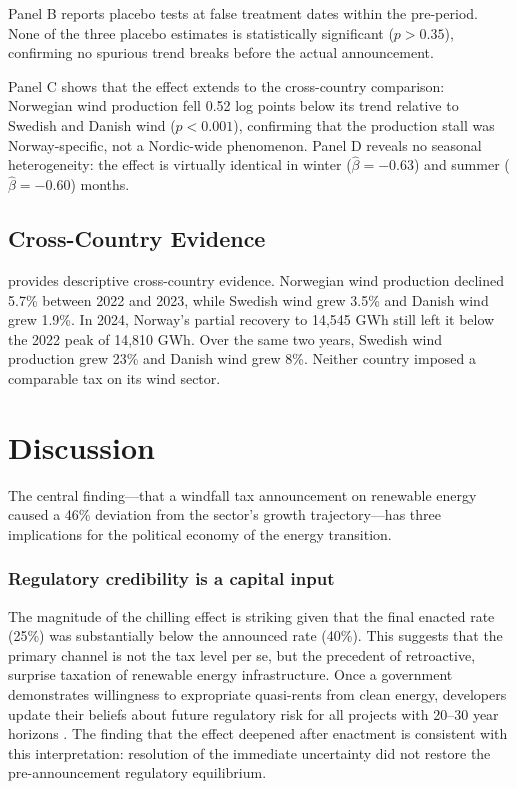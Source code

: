 \documentclass[12pt]{article}
\begin{document}
Panel B reports placebo tests at false treatment dates within the pre-period. None of the three placebo estimates is statistically significant ($p > 0.35$), confirming no spurious trend breaks before the actual announcement.

Panel C shows that the effect extends to the cross-country comparison: Norwegian wind production fell 0.52 log points below its trend relative to Swedish and Danish wind ($p < 0.001$), confirming that the production stall was Norway-specific, not a Nordic-wide phenomenon. Panel D reveals no seasonal heterogeneity: the effect is virtually identical in winter ($\hat{\beta} = -0.63$) and summer ($\hat{\beta} = -0.60$) months.

\subsection{Cross-Country Evidence}



 provides descriptive cross-country evidence. Norwegian wind production declined 5.7\% between 2022 and 2023, while Swedish wind grew 3.5\% and Danish wind grew 1.9\%. In 2024, Norway's partial recovery to 14,545 GWh still left it below the 2022 peak of 14,810 GWh. Over the same two years, Swedish wind production grew 23\% and Danish wind grew 8\%. Neither country imposed a comparable tax on its wind sector.


\section{Discussion}
\label{sec:discussion}

The central finding---that a windfall tax announcement on renewable energy caused a 46\% deviation from the sector's growth trajectory---has three implications for the political economy of the energy transition.

\subsubsection*{Regulatory credibility is a capital input} The magnitude of the chilling effect is striking given that the final enacted rate (25\%) was substantially below the announced rate (40\%). This suggests that the primary channel is not the tax level per se, but the precedent of retroactive, surprise taxation of renewable energy infrastructure. Once a government demonstrates willingness to expropriate quasi-rents from clean energy, developers update their beliefs about future regulatory risk for all projects with 20--30 year horizons \citep{helm2003credible}. The finding that the effect deepened after enactment is consistent with this interpretation: resolution of the immediate uncertainty did not restore the pre-announcement regulatory equilibrium.
\end{document}
